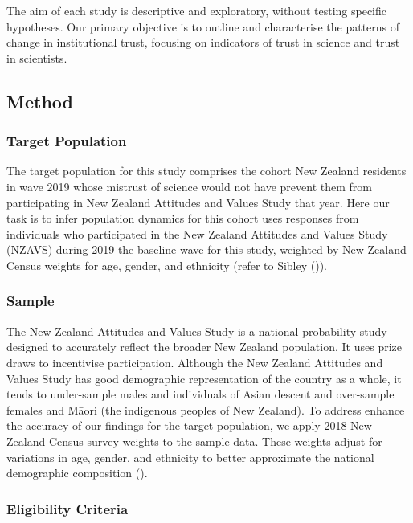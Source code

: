 \documentclass[
  single column]{article}
\begin{document}
The aim of each study is descriptive and exploratory, without testing
specific hypotheses. Our primary objective is to outline and
characterise the patterns of change in institutional trust, focusing on
indicators of trust in science and trust in scientists.

\subsection{Method}\label{method}

\subsubsection{Target Population}\label{target-population}

The target population for this study comprises the cohort New Zealand
residents in wave 2019 whose mistrust of science would not have prevent
them from participating in New Zealand Attitudes and Values Study that
year. Here our task is to infer population dynamics for this cohort uses
responses from individuals who participated in the New Zealand Attitudes
and Values Study (NZAVS) during 2019 the baseline wave for this study,
weighted by New Zealand Census weights for age, gender, and ethnicity
(refer to Sibley ()).

\subsubsection{Sample}\label{sample}

The New Zealand Attitudes and Values Study is a national probability
study designed to accurately reflect the broader New Zealand population.
It uses prize draws to incentivise participation. Although the New
Zealand Attitudes and Values Study has good demographic representation
of the country as a whole, it tends to under-sample males and
individuals of Asian descent and over-sample females and Māori (the
indigenous peoples of New Zealand). To address enhance the accuracy of
our findings for the target population, we apply 2018 New Zealand Census
survey weights to the sample data. These weights adjust for variations
in age, gender, and ethnicity to better approximate the national
demographic composition ().

\subsubsection{Eligibility Criteria}\label{eligibility-criteria}
\end{document}
